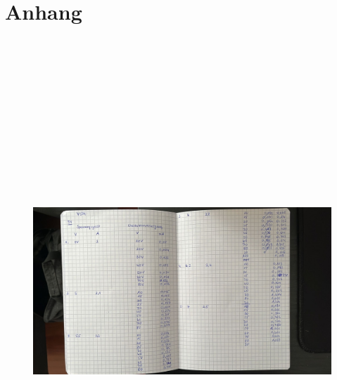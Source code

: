 \section{Anhang}

\begin{figure}[H]
    \centering
    \includegraphics[height=190mm]{bilder/Anh1.jpeg}
\end{figure}

